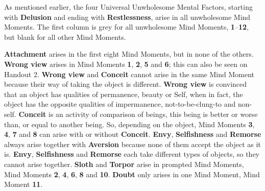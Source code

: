 As mentioned earlier, the four Universal Unwholesome Mental Factors, starting with \textbf{Delusion} and ending with \textbf{Restlessness}, arise in all unwholesome Mind Moments. The first column is grey for all unwholesome Mind Moments, \textbf{1}--\textbf{12}, but blank for all other Mind Moments.

\textbf{Attachment} arises in the first eight Mind Moments, but in none of the others. \textbf{Wrong view} arises in Mind Moments \textbf{1}, \textbf{2}, \textbf{5} and \textbf{6}; this can also be seen on Handout 2. \textbf{Wrong view} and \textbf{Conceit} cannot arise in the same Mind Moment because their way of taking the object is different. \textbf{Wrong view} is convinced that an object has qualities of permanence, beauty or Self, when in fact, the object has the opposite qualities of impermanence, not-to-be-clung-to and non-self. \textbf{Conceit} is an activity of comparison of beings, this being is better or worse than, or equal to another being. So, depending on the object, Mind Moments \textbf{3}, \textbf{4}, \textbf{7} and \textbf{8} can arise with or without \textbf{Conceit}. \textbf{Envy}, \textbf{Selfishness} and \textbf{Remorse} always arise together with \textbf{Aversion} because none of them accept the object as it is. \textbf{Envy}, \textbf{Selfishness} and \textbf{Remorse} each take different types of objects, so they cannot arise together. \textbf{Sloth} and \textbf{Torpor} arise in prompted Mind Moments, Mind Moments \textbf{2}, \textbf{4}, \textbf{6}, \textbf{8} and \textbf{10}. \textbf{Doubt} only arises in one Mind Moment, Mind Moment \textbf{11}.

